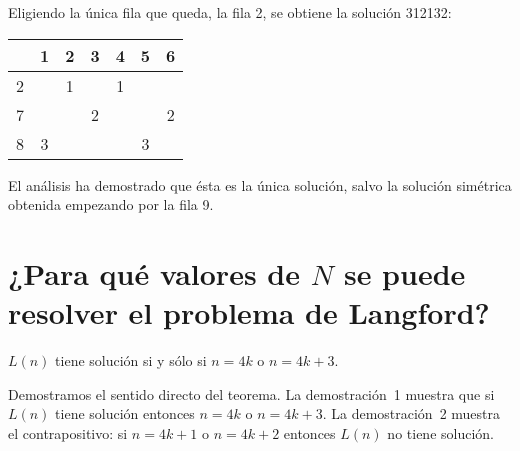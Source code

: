 Eligiendo la única fila que queda, la fila 2, se obtiene la solución 3{}1{}2{}1{}3{}2:
\begin{center}
\addtolength{\tabcolsep}{4pt}
\begin{tabular}{|c||c|c|c|c|c|c|}
\hline
&1&2&3&4&5&6\\\hline\hline
2&&1&&1&&\\\hline
7&&&2&&&2\\\hline
8&3&&&&3&\\\hline
\end{tabular}
\end{center}
El análisis ha demostrado que ésta es la única solución, salvo la solución simétrica obtenida empezando por la fila 9.

\section[¿Para qué valores de $N$ se puede resolver el problema?]
{¿Para qué valores de $N$ se puede resolver el problema de Langford?}\label{s.langford-theorem}

\begin{theorem} \label{thm.langford}
$L(n)$ tiene solución si y sólo si $n=4k$ o $n=4k+3$.
\end{theorem}

Demostramos el sentido directo del teorema. La demostración~1 muestra que si $L(n)$ tiene solución entonces $n=4k$ o $n=4k+3$. La demostración~2 muestra el contrapositivo: si $n=4k+1$ o $n=4k+2$ entonces $L(n)$ no tiene solución.

